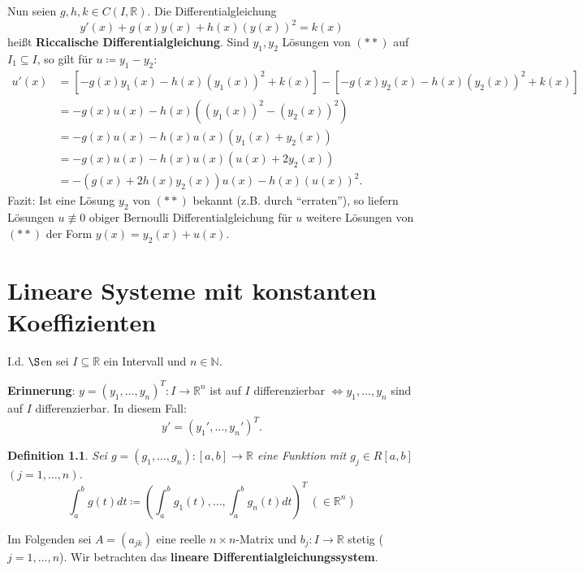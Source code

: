 \documentclass[12pt]{extreport} %
\newcommand{\N}{\mathbb{N}}
\newcommand{\R}{\mathbb{R}}
\theoremstyle{named}
\theoremstyle{nnamed}
\theoremstyle{itshape}
\newtheorem*{definition}{Definition}
\theoremstyle{normal}
\begin{document}
Nun seien $g,h,k \in C(I, \R)$. Die Differentialgleichung
\begin{equation*}
	y'(x) + g(x) y(x) + h(x) \left( y(x) \right)^{2} = k(x) \tag*{$(**)$}
\end{equation*}
hei{\ss}t \textbf{Riccalische Differentialgleichung}.  Sind $y_{1}, y_{2}$ Lösungen von $(**)$ auf $I_{1} \subseteq I$, so gilt für $u \coloneqq y_{1} - y_{2}$:
	\begin{align*}
		u'(x) & = \left[ -g(x) y_{1}(x) - h(x) \left( y_{1}(x) \right)^{2} + k(x) \right] - \left[ -g(x) y_{2}(x) - h(x) \left( y_{2}(x) \right)^{2} + k(x) \right] \\
			& = -g(x) u(x) - h(x) \left( (y_{1}(x))^{2} - (y_{2}(x))^{2} \right) \\
			& = -g(x) u(x) - h(x) u(x) \left( y_{1}(x) + y_{2}(x) \right) \\
			& = -g(x) u(x) - h(x) u(x) \left( u(x) + 2y_{2}(x) \right)	 \\	
			& = - \left( g(x) + 2h(x) y_{2}(x) \right) u(x) - h(x) \left( u(x) \right)^{2}.
	\end{align*}
Fazit: Ist eine Lösung $y_{2}$ von $(**)$ bekannt (z.B. durch \enquote{erraten}), so liefern Lösungen $u \not\equiv 0$ obiger Bernoulli Differentialgleichung für $u$ weitere Lösungen von $(**)$ der Form $y(x) = y_{2}(x) + u(x)$.
 

\chapter{Lineare Systeme mit konstanten Koeffizienten}


I.d. $\S$en sei $I \subseteq \R$ ein Intervall und $n \in \N$.

\textbf{Erinnerung}: $y = (y_{1}, \dotsc, y_{n})^{T} \colon I \rightarrow \R^{n}$ ist auf $I$ differenzierbar $\iff y_{1}, \dotsc, y_{n}$ sind auf $I$ differenzierbar. In diesem Fall:
	$$ y' = \left( y_{1}', \dotsc, y_{n}' \right)^{T}. $$


\begin{definition}
	Sei $g = (g_{1}, \dotsc, g_{n}) \colon [a, b] \rightarrow \R$ eine Funktion mit $g_{j} \in R[a, b]$ $(j = 1, \dotsc, n)$.
	$$ \int_{a}^{b} g(t) dt \coloneqq \left( \int_{a}^{b} g_{1}(t), \dotsc, \int_{a}^{b} g_{n}(t) dt \right)^{T} ~ \left( \in \R^{n} \right) $$
\end{definition}
	
	  	 
Im Folgenden sei $A = (a_{jk})$ eine reelle $n \times n$-Matrix und $b_{j} \colon I \rightarrow \R$ stetig ($j = 1, \dotsc, n$). Wir betrachten das \textbf{lineare Differentialgleichungssystem}.
\end{document}
